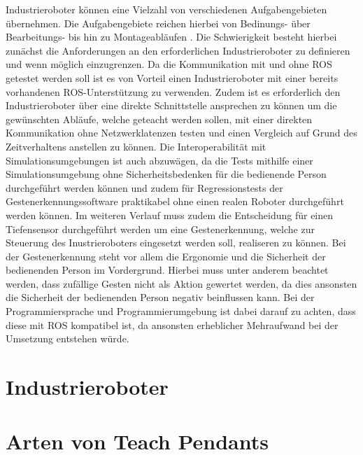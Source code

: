 
Industrieroboter können eine Vielzahl von verschiedenen Aufgabengebieten übernehmen. Die Aufgabengebiete reichen hierbei von Bedinungs- über Bearbeitungs- bis hin zu Montageabläufen \cite{noauthor_industrieroboter_2020}. Die Schwierigkeit besteht hierbei zunächst die Anforderungen an den erforderlichen Industrieroboter zu definieren und wenn möglich einzugrenzen. Da die Kommunikation mit und ohne ROS getestet werden soll ist es von Vorteil einen Industrieroboter mit einer bereits vorhandenen ROS-Unterstützung zu verwenden. Zudem ist es erforderlich den Industrieroboter über eine direkte Schnittstelle ansprechen zu können um die gewünschten Abläufe, welche geteacht werden sollen, mit einer direkten Kommunikation ohne Netzwerklatenzen testen und einen Vergleich auf Grund des Zeitverhaltens anstellen zu können. Die Interoperabilität mit Simulationsumgebungen ist auch abzuwägen, da die Tests mithilfe einer Simulationsumgebung ohne Sicherheitsbedenken für die bedienende Person durchgeführt werden können und zudem für Regressionstests der Gestenerkennungssoftware praktikabel ohne einen realen Roboter durchgeführt werden können. Im weiteren Verlauf muss zudem die Entscheidung für einen Tiefensensor durchgeführt werden um eine Gestenerkennung, welche zur Steuerung des Inustrieroboters eingesetzt werden soll, realiseren zu können. Bei der Gestenerkennung steht vor allem die Ergonomie und die Sicherheit der bedienenden Person im Vordergrund. Hierbei muss unter anderem beachtet werden, dass zufällige Gesten nicht als Aktion gewertet werden, da dies ansonsten die Sicherheit der bedienenden Person negativ beinflussen kann. Bei der Programmiersprache und Programmierumgebung ist dabei darauf zu achten, dass diese mit ROS kompatibel ist, da ansonsten erheblicher Mehraufwand bei der Umsetzung entstehen würde.


\section{Industrieroboter}


\section{Arten von Teach Pendants}


